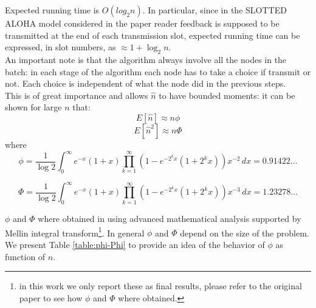 \documentclass[12pt,a4paper]{report}
\begin{document}
Expected running time is $O(log_{2}n)$. In particular, since in the SLOTTED ALOHA model considered in the paper reader feedback is supposed to be transmitted at the end of each transmission slot, expected running time can be expressed, in slot numbers, as $\approx 1+\log_{2}n$.\\

An important note is that the algorithm always involve all the nodes in the batch: in each stage of the algorithm each node has to take a choice if transmit or not. 
Each choice is independent of what the node did in the previous steps. \\ 
This is of great importance and allows $\hat{n}$ to have bounded moments: it can be shown for large $n$ that:
\begin{equation}
E[\hat{n}] \approx n\phi
\end{equation}
\begin{equation}
E[\hat{n}^{2}] \approx n\Phi
\end{equation}
where
\begin{equation}
\phi= \frac{1}{\log2} \int_{0}^{\infty} \! e^{-x}(1+x) \prod_{k=1}^{\infty}(1-e^{-2^{k}x}(1+2^{k}x))x^{-2} \, dx = 0.91422\dots
\end{equation}

\begin{equation}
\Phi= \frac{1}{\log2} \int_{0}^{\infty} \! e^{-x}(1+x) \prod_{k=1}^{\infty}(1-e^{-2^{k}x}(1+2^{k}x))x^{-3} \, dx =1.23278\dots
\end{equation}

\noindent $\phi$ and $\Phi$ where obtained in \cite{greenberg87} using advanced mathematical analysis supported by Mellin integral transform\footnote{in this work we only report these as final results, please refer to the original paper to see how $\phi$ and $\Phi$ where obtained.}.
In general $\phi$ and $\Phi$ depend on the size of the problem. We present Table \ref{table:phi-Phi} to provide an idea of the behavior of $\phi$ as function of $n$.\\
\end{document}
